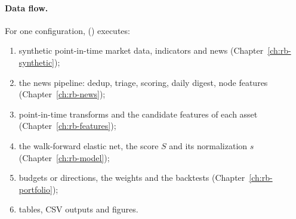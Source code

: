 \paragraph{Data flow.} For one configuration,  () executes:
\begin{enumerate}
  \item synthetic point-in-time market data, indicators and news (Chapter~\ref{ch:rb-synthetic});
  \item the news pipeline: dedup, triage, scoring, daily digest, node features (Chapter~\ref{ch:rb-news});
  \item point-in-time transforms and the candidate features of each asset (Chapter~\ref{ch:rb-features});
  \item the walk-forward elastic net, the score $S$ and its normalization $s$ (Chapter~\ref{ch:rb-model});
  \item budgets or directions, the weights and the backtests (Chapter~\ref{ch:rb-portfolio});
  \item tables, CSV outputs and figures.
\end{enumerate}

